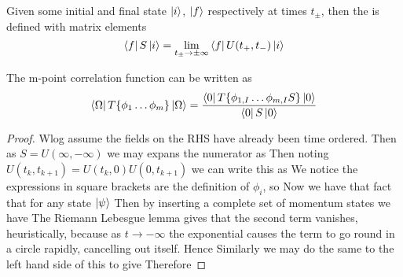 \documentclass{article}
\begin{document}
\begin{definition}[$S$-matrix]
Given some initial and final state $\ket{i}$, $\ket{f}$ respectively at times $t_\pm$, then the  is defined with matrix elements 
\[
\bra{f}S\ket{i} = \lim_{t_\pm \to \pm\infty} \bra{f} U(t_+, t_-) \ket{i}
\]
\end{definition}

\begin{theorem}
The m-point correlation function can be written as 
\[
\bra{\Omega} T\{ \phi_1 \dots \phi_m \} \ket{\Omega} = \frac{\bra{0} T\{\phi_{1,I} \dots \phi_{m,I} S \} \ket{0}}{\bra{0} S \ket{0}}
\]
\end{theorem}
\begin{proof}
Wlog assume the fields on the RHS have already been time ordered. Then as $S = U(\infty,-\infty)$ we may expans the numerator as 
Then noting $U(t_k,t_{k+1}) = U(t_k,0)U(0,t_{k+1})$ we can write this as 
We notice the expressions in square brackets are the definition of $\phi_i$, so 
Now we have that fact that for any state $\ket{\psi}$ 
Then by inserting a complete set of momentum states we have 
The Riemann Lebesgue lemma gives that the second term vanishes, heuristically, because as $t \to -\infty$ the exponential causes the term to go round in a circle rapidly, cancelling out itself. Hence 
Similarly we may do the same to the left hand side of this to give 
Therefore 
\end{proof}
\end{document}
